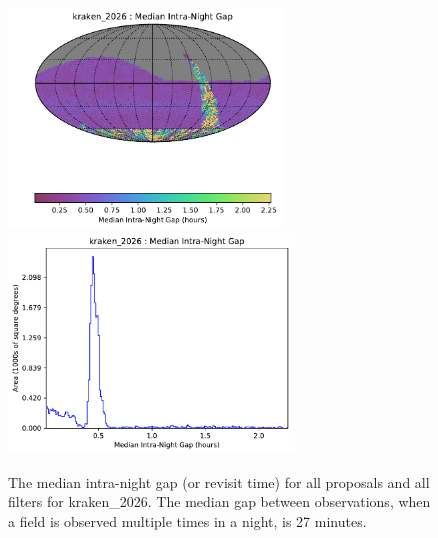 \documentclass[DM,lsstdraft,authoryear,toc]{lsstdoc}
\begin{document}
\begin{figure}[htb]
\centering
\vskip -0.0in
\includegraphics[height=2.3in]{figures/kraken_2026_Median_Intra-Night_Gap_HEAL_SkyMap.pdf}
\includegraphics[height=2.3in]{figures/kraken_2026_Median_Intra-Night_Gap_HEAL_Histogram.pdf}
\vskip -0.1in
\caption{The median intra-night gap (or revisit time) for all proposals and all filters for  kraken\_2026.
The median gap between observations, when a field is observed multiple times in a night, is 27 minutes.
\label{fig:baseline_InterGapAll}}
\end{figure}
\end{document}
